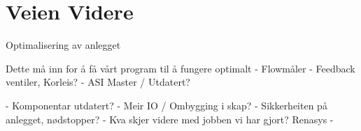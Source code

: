\chapter{Veien Videre}
\thispagestyle{fancy}

Optimalisering av anlegget

Dette må inn for å få vårt program til å fungere optimalt
- Flowmåler
- Feedback ventiler, Korleis?
- ASI Master / Utdatert?


- Komponentar utdatert? 
- Meir IO / Ombygging i skap?
- Sikkerheiten på anlegget, nødstopper? 
- Kva skjer videre med jobben vi har gjort? Renasys
- 